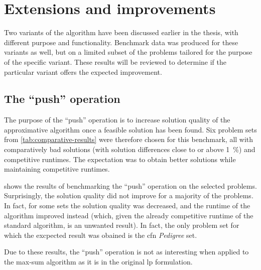 \section{Extensions and improvements}
Two variants of the algorithm have been discussed earlier in the thesis, with different purpose and functionality.
Benchmark data was produced for these variants as well, but on a limited subset of the problems tailored for the purpose of the specific variant.
These results will be reviewed to determine if the particular variant offers the expected improvement.


\subsection{The \enquote{push} operation}
The purpose of the \enquote{push} operation is to increase solution quality of the approximative algorithm once a feasible solution has been found.
Six problem sets from \cref{tab:comparative-results} were therefore chosen for this benchmark, all with comparatively bad solutions (with solution differences close to or above \SI{1}{\percent}) and competitive runtimes.
The expectation was to obtain better solutions while maintaining competitive runtimes.

 shows the results of benchmarking the \enquote{push} operation on the selected problems.
Surprisingly, the solution quality did not improve for a majority of the problems.
In fact, for some sets the solution quality was decreased, and the runtime of the algorithm improved instead (which, given the already competitive runtime of the standard algorithm, is an unwanted result).
In fact, the only problem set for which the excpected result was obained is the \gls{cfn} \emph{Pedigree} set.



Due to these results, the \enquote{push} operation is not as interesting when applied to the max-sum algorithm as it is in the original \gls{lp} formulation.


